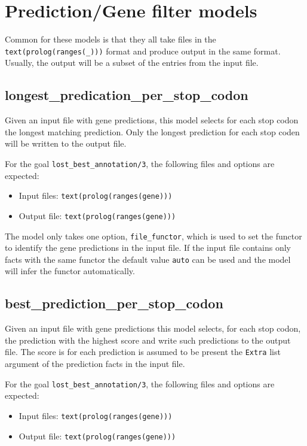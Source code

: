 \documentclass{book}
\begin{document}
\section{Prediction/Gene filter models}

Common for these models is that they all take files in the
\texttt{text(prolog(ranges(\_)))} format and produce output in 
the same format. Usually, the output will be a subset of the entries
from the input file.

\subsection{longest\_predication\_per\_stop\_codon}

Given an input file with gene predictions, this model selects for each
stop codon the longest matching prediction. Only the longest
prediction for each stop coden will be written to the output file.

For the goal \texttt{lost\_best\_annotation/3}, the following files
and options are expected:
\begin{itemize}
\item Input files: \texttt{text(prolog(ranges(gene)))}
\item Output file: \texttt{text(prolog(ranges(gene)))}
\end{itemize}

The model only takes one option, \texttt{file\_functor}, which is 
used to set the functor to identify the gene predictions in the input
file. If the input file contains only facts with the same functor the 
default value \texttt{auto} can be used and the model will infer the 
functor automatically.

\subsection{best\_prediction\_per\_stop\_codon}

Given an input file with gene predictions this model selects, for each
stop codon, the prediction with the highest score and write such
predictions to the output file. The score is for each prediction is
assumed to be present the \texttt{Extra} list argument of the
prediction facts in the input file. 

For the goal \texttt{lost\_best\_annotation/3}, the following files
and options are expected:
\begin{itemize}
\item Input files: \texttt{text(prolog(ranges(gene)))}
\item Output file: \texttt{text(prolog(ranges(gene)))}
\end{itemize}
\end{document}
